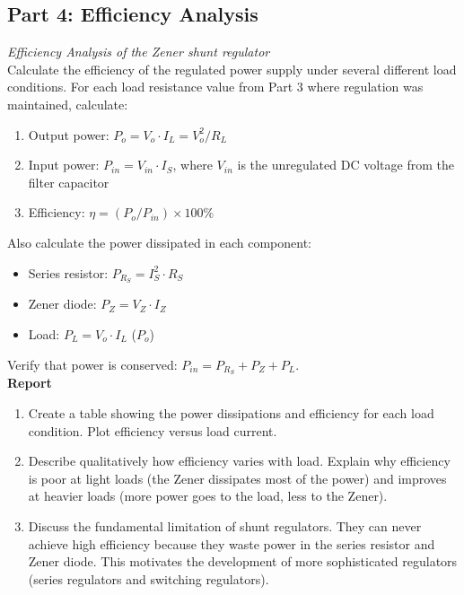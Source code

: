 \documentclass[10pt]{article}
\begin{document}
\subsection{Part 4: Efficiency Analysis}
\emph{Efficiency Analysis of the Zener shunt regulator}\\

Calculate the efficiency of the regulated power supply under several different load conditions.  For each load resistance value from Part 3 where regulation was maintained, calculate: \\

\begin{enumerate}
    \item Output power:  $P_o = V_o \cdot I_L = V_o^2 / R_L$
    \item Input power: $P_{in} = V_{in} \cdot I_S$, where $V_{in}$ is the unregulated DC voltage from the filter capacitor
    \item Efficiency: $\eta = (P_o / P_{in}) \times 100\%$
\end{enumerate}

Also calculate the power dissipated in each component:
\begin{itemize}
    \item Series resistor: $P_{R_S} = I_S^2 \cdot R_S$
    \item Zener diode: $P_Z = V_Z \cdot I_Z$
    \item Load: $P_L = V_o \cdot I_L$ ($P_o$)
\end{itemize}

Verify that power is conserved:  $P_{in} = P_{R_S} + P_Z + P_L$.\\

\textbf{Report}
\begin {enumerate}
\item Create a table showing the power dissipations and efficiency for each load condition. Plot efficiency versus load current.
\item Describe qualitatively how efficiency varies with load.  Explain why efficiency is poor at light loads (the Zener dissipates most of the power) and improves at heavier loads (more power goes to the load, less to the Zener).
\item Discuss the fundamental limitation of shunt regulators. They can never achieve high efficiency because they waste power in the series resistor and Zener diode.  This motivates the development of more sophisticated regulators (series regulators and switching regulators).
\end{enumerate}
\end{document}
